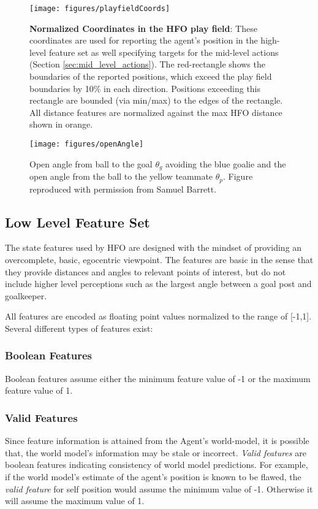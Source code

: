 \documentclass[12pt]{article}
\begin{document}
\begin{figure}[htp]
  \centering
  \texttt{[image: figures/playfieldCoords]}
  \caption{\textbf{Normalized Coordinates in the HFO play field}:
    These coordinates are used for reporting the agent's position in
    the high-level feature set as well specifying targets for the
    mid-level actions (Section \ref{sec:mid_level_actions}). The
    red-rectangle shows the boundaries of the reported positions,
    which exceed the play field boundaries by 10\% in each
    direction. Positions exceeding this rectangle are bounded (via
    min/max) to the edges of the rectangle. All distance features are
    normalized against the max HFO distance shown in orange.}
  \label{fig:playfieldCoords}
\end{figure}

\begin{figure}[htp]
  \centering
  \texttt{[image: figures/openAngle]}
  \caption{Open angle from ball to the goal $\theta_g$ avoiding the
    blue goalie and the open angle from the ball to the yellow
    teammate $\theta_p$. Figure reproduced with permission from Samuel
    Barrett.}
  \label{fig:openAngle}
\end{figure}

\subsection {Low Level Feature Set}
The state features used by HFO are designed with the mindset of
providing an overcomplete, basic, egocentric viewpoint. The features
are basic in the sense that they provide distances and angles to
relevant points of interest, but do not include higher level
perceptions such as the largest angle between a goal post and
goalkeeper.

All features are encoded as floating point values normalized to the
range of [-1,1]. Several different types of features exist:

\subsubsection{Boolean Features}
Boolean features assume either the minimum feature value of -1 or the
maximum feature value of 1.

\subsubsection{Valid Features}
Since feature information is attained from the Agent's world-model, it
is possible that, the world model's information may be stale or
incorrect. \textit{Valid features} are boolean features indicating
consistency of world model predictions. For example, if the world
model's estimate of the agent's position is known to be flawed, the
\textit{valid feature} for self position would assume the minimum
value of -1. Otherwise it will assume the maximum value of 1.
\end{document}
